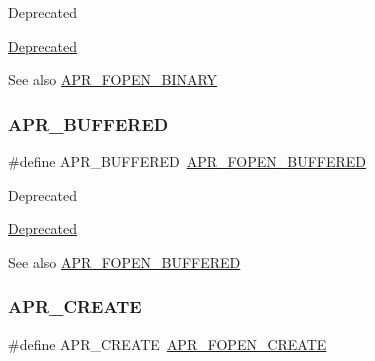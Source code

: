 \begin{DoxyRefDesc}{Deprecated}
\item[\mbox{\hyperlink{deprecated__deprecated000022}{Deprecated}}]\end{DoxyRefDesc}
\begin{DoxySeeAlso}{See also}
\mbox{\hyperlink{group__apr__file__open__flags_gacb20b3028864f34cb26314fe2cacc3fa}{A\+P\+R\+\_\+\+F\+O\+P\+E\+N\+\_\+\+B\+I\+N\+A\+RY}} 
\end{DoxySeeAlso}
\mbox{\label{group__apr__file__open__flags_ga6edc818199e8b90e3dabf97c42a27158}} 
\subsubsection{\texorpdfstring{A\+P\+R\+\_\+\+B\+U\+F\+F\+E\+R\+ED}{APR\_BUFFERED}}
{\footnotesize\ttfamily \#define A\+P\+R\+\_\+\+B\+U\+F\+F\+E\+R\+ED~\mbox{\hyperlink{group__apr__file__open__flags_gac48fd4c853c9f561632a2e8aaf5d8d97}{A\+P\+R\+\_\+\+F\+O\+P\+E\+N\+\_\+\+B\+U\+F\+F\+E\+R\+ED}}}

\begin{DoxyRefDesc}{Deprecated}
\item[\mbox{\hyperlink{deprecated__deprecated000024}{Deprecated}}]\end{DoxyRefDesc}
\begin{DoxySeeAlso}{See also}
\mbox{\hyperlink{group__apr__file__open__flags_gac48fd4c853c9f561632a2e8aaf5d8d97}{A\+P\+R\+\_\+\+F\+O\+P\+E\+N\+\_\+\+B\+U\+F\+F\+E\+R\+ED}} 
\end{DoxySeeAlso}
\mbox{\label{group__apr__file__open__flags_gac210e96bc821dbaa83c326e775dad028}} 
\subsubsection{\texorpdfstring{A\+P\+R\+\_\+\+C\+R\+E\+A\+TE}{APR\_CREATE}}
{\footnotesize\ttfamily \#define A\+P\+R\+\_\+\+C\+R\+E\+A\+TE~\mbox{\hyperlink{group__apr__file__open__flags_gafe94f21ccbf411172e70e7f473af251a}{A\+P\+R\+\_\+\+F\+O\+P\+E\+N\+\_\+\+C\+R\+E\+A\+TE}}}


